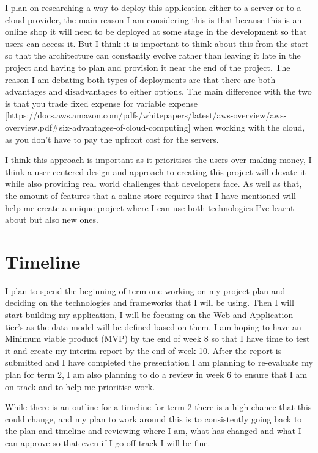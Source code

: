 \documentclass[]{project_report}
\begin{document}
I plan on researching a way to deploy this application either to a server or to a cloud provider, the main reason I am considering this is that because this is an online shop it will need to be deployed at some stage in the development so that users can access it. But I think it is important to think about this from the start so that the architecture can constantly evolve rather than leaving it late in the project and having to plan and provision it near the end of the project. The reason I am debating both types of deployments are that there are both advantages and disadvantages to either options. The main difference with the two is that you trade fixed expense for variable expense [https://docs.aws.amazon.com/pdfs/whitepapers/latest/aws-overview/aws-overview.pdf#six-advantages-of-cloud-computing] when working with the cloud, as you don't have to pay the upfront cost for the servers.

I think this approach is important as it prioritises the users over making money, I think a user centered design and approach to creating this project will elevate it while also providing real world challenges that developers face. As well as that, the amount of features that a online store requires that I have mentioned will help me create a unique project where I can use both technologies I've learnt about but also new ones.

\newpage

\chapter{Timeline}


I plan to spend the beginning of term one working on my project plan and deciding on the technologies and frameworks that I will be using. Then I will start building my application, I will be focusing on the Web and Application tier's as the data model will be defined based on them. I am hoping to have an Minimum viable product (MVP) by the end of week 8 so that I have time to test it and create my interim report by the end of week 10. After the report is submitted and I have completed the presentation I am planning to re-evaluate my plan for term 2, I am also planning to do a review in week 6 to ensure that I am on track and to help me prioritise work.

While there is an outline for a timeline for term 2 there is a high chance that this could change, and my plan to work around this is to consistently going back to the plan and timeline and reviewing where I am, what has changed and what I can approve so that even if I go off track I will be fine.
\end{document}
